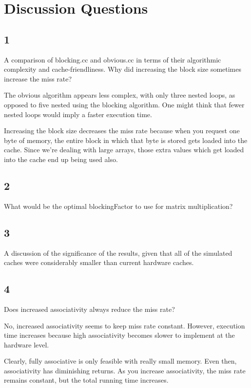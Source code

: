 \documentclass[letterpaper, 12pt, oneside]{memoir}
\begin{document}
\section{Discussion Questions}
\subsection{1}
A comparison of blocking.cc and obvious.cc in terms of their algorithmic 
complexity and cache-friendliness. Why did increasing the block size sometimes 
increase the miss rate?

The obvious algorithm appears less complex, with only three nested loops, as
opposed to five nested using the blocking algorithm. One might think that
fewer nested loops would imply a faster execution time. 


Increasing the block size decreases the miss rate because when you request
one byte of memory, the entire block in which that byte is stored gets loaded
into the cache. Since we're dealing with large arrays, those extra values which
get loaded into the cache end up being used also.


\subsection{2}
What would be the optimal blockingFactor to use for matrix multiplication?


\subsection{3}
A discussion of the significance of the results, given that all of the simulated
caches were considerably smaller than current hardware caches.


\subsection{4}
Does increased associativity always reduce the miss rate?

No, increased associativity seems to keep miss rate constant. However, execution
time increases because high associativity becomes slower to implement at 
the hardware level.

Clearly, fully associative is only feasible with really small memory. Even then, 
associativity has diminishing returns. As you increase associativity, the miss
rate remains constant, but the total running time increases.
\end{document}
